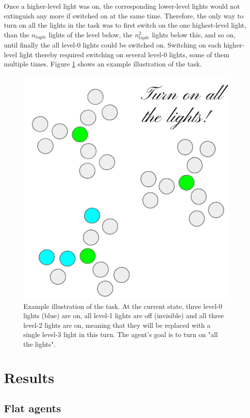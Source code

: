 \documentclass{article}
\begin{document}
Once a higher-level light was on, the corresponding lower-level lights would not extinguish any more if switched on at the same time. Therefore, the only way to turn on all the lights in the task was to first switch on the one highest-level light, than the $n_{tuple}$ lights of the level below, the $n_{tuple} ^ 2$ lights below this, and so on, until finally the all level-0 lights could be switched on. Switching on each higher-level light thereby required switching on several level-0 lights, some of them multiple times. Figure \ref{TaskFigure} shows an example illustration of the task.

\begin{figure}[h]
  \centering
  \includegraphics[width=0.5\linewidth]{NIPSfigures/Task.png}
  \caption{Example illustration of the task. At the current state, three level-0 lights (blue) are on, all level-1 lights are off (invisible) and all three level-2 lights are on, meaning that they will be replaced with a single level-3 light in this turn. The agent's goal is to turn on "all the lights".}
  \label{TaskFigure}
\end{figure}


\section{Results}

\subsection{Flat agents}
\end{document}
